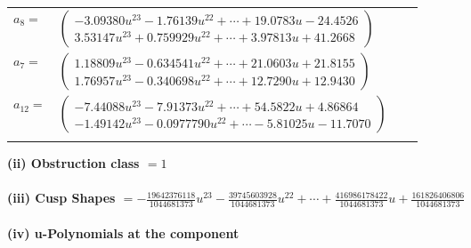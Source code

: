 \documentclass[1p]{elsarticle_modified}
\theoremstyle{definition}
\begin{document}
\begin{tabular}{m{7pt} m{180pt} m{7pt} m{180pt} }
\flushright $a_{8}=$&$\begin{pmatrix}-3.09380 u^{23}-1.76139 u^{22}+\cdots+19.0783 u-24.4526\\3.53147 u^{23}+0.759929 u^{22}+\cdots+3.97813 u+41.2668\end{pmatrix}$ \\
\flushright $a_{7}=$&$\begin{pmatrix}1.18809 u^{23}-0.634541 u^{22}+\cdots+21.0603 u+21.8155\\1.76957 u^{23}-0.340698 u^{22}+\cdots+12.7290 u+12.9430\end{pmatrix}$ \\
\flushright $a_{12}=$&$\begin{pmatrix}-7.44088 u^{23}-7.91373 u^{22}+\cdots+54.5822 u+4.86864\\-1.49142 u^{23}-0.0977790 u^{22}+\cdots-5.81025 u-11.7070\end{pmatrix}$\\&\end{tabular}
\flushleft \textbf{(ii) Obstruction class $= 1$}\\~\\
\flushleft \textbf{(iii) Cusp Shapes $= -\frac{19642376118}{1044681373} u^{23}-\frac{39745603928}{1044681373} u^{22}+\cdots+\frac{416986178422}{1044681373} u+\frac{161826406806}{1044681373}$}\\~\\
\newpage\renewcommand{\arraystretch}{1}
\flushleft \textbf{(iv) u-Polynomials at the component}\newline \\
\end{document}
